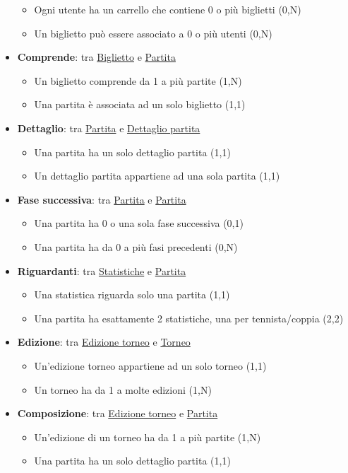 \documentclass[10pt]{article}
\begin{document}
\begin{itemize}
    \begin{itemize}
        \item Ogni utente ha un carrello che contiene 0 o più biglietti (0,N)
        \item Un biglietto può essere associato a 0 o più utenti (0,N)
    \end{itemize}
    \item \textbf{Comprende}: tra \underline{Biglietto} e \underline{Partita}
    \begin{itemize}
        \item Un biglietto comprende da 1 a più partite (1,N)
        \item Una partita è associata ad un solo biglietto (1,1)
    \end{itemize}
    \item \textbf{Dettaglio}: tra \underline{Partita} e \underline{Dettaglio partita}
    \begin{itemize}
        \item Una partita ha un solo dettaglio partita (1,1)
        \item Un dettaglio partita appartiene ad una sola partita (1,1)
    \end{itemize}
    \item \textbf{Fase successiva}: tra \underline{Partita} e \underline{Partita}
    \begin{itemize}
        \item Una partita ha 0 o una sola fase successiva (0,1)
        \item Una partita ha da 0 a più fasi precedenti (0,N)
    \end{itemize}
    \item \textbf{Riguardanti}: tra \underline{Statistiche} e \underline{Partita}
    \begin{itemize}
        \item Una statistica riguarda solo una partita (1,1)
        \item Una partita ha esattamente 2 statistiche, una per tennista/coppia (2,2)
    \end{itemize}
    \item \textbf{Edizione}: tra \underline{Edizione torneo} e \underline{Torneo}
    \begin{itemize}
        \item Un'edizione torneo appartiene ad un solo torneo (1,1)
        \item Un torneo ha da 1 a molte edizioni (1,N)
    \end{itemize}
    \item \textbf{Composizione}: tra \underline{Edizione torneo} e \underline{Partita}
    \begin{itemize}
        \item Un'edizione di un torneo ha da 1 a più partite (1,N)
        \item Una partita ha un solo dettaglio partita (1,1)
    \end{itemize}
    
\end{itemize}
\end{document}
